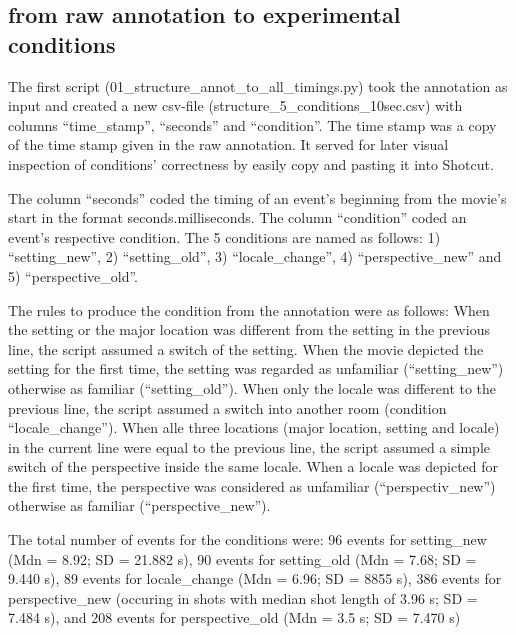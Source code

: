 \documentclass[10pt,a4paper,twocolumn]{article}
\begin{document}


\subsection*{from raw annotation to experimental conditions}


The first script (01\_structure\_annot\_to\_all\_timings.py) took
the annotation as input and created a new csv-file (structure\_5\_conditions\_10sec.csv)
with columns ``time\_stamp'', ``seconds'' and ``condition''.
The time stamp was a copy of the time stamp given in the raw annotation.
It served for later visual inspection of conditions' correctness by
easily copy and pasting it into Shotcut. 

The column ``seconds'' coded the timing of an event's beginning
from the movie's start in the format seconds.milliseconds. The column
``condition'' coded an event's respective condition. The 5 conditions
are named as follows: 1) ``setting\_new'', 2) ``setting\_old'',
3) ``locale\_change'', 4) ``perspective\_new'' and 5) ``perspective\_old''. 

The rules to produce the condition from the annotation were as follows:
When the setting or the major location was different from the setting
in the previous line, the script assumed a switch of the setting.
When the movie depicted the setting for the first time, the setting
was regarded as unfamiliar (``setting\_new'') otherwise as familiar
(``setting\_old''). When only the locale was different to the previous
line, the script assumed a switch into another room (condition ``locale\_change'').
When alle three locations (major location, setting and locale) in
the current line were equal to the previous line, the script assumed
a simple switch of the perspective inside the same locale. When a
locale was depicted for the first time, the perspective was considered
as unfamiliar (``perspectiv\_new'') otherwise as familiar (``perspective\_new''). 

The total number of events for the conditions were: 96 events for
setting\_new (Mdn = 8.92; SD = 21.882 s), 90 events for setting\_old
(Mdn = 7.68; SD = 9.440 s), 89 events for locale\_change (Mdn = 6.96;
SD = 8855 s), 386 events for perspective\_new (occuring in shots with
median shot length of 3.96 s; SD = 7.484 s), and 208 events for perspective\_old
(Mdn = 3.5 s; SD = 7.470 s)
\end{document}

